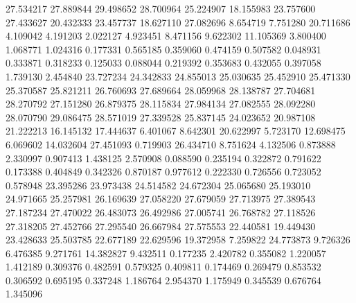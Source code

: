 27.534217
27.889844
29.498652
28.700964
25.224907
18.155983
23.757600
27.433627
20.432333
23.457737
18.627110
27.082696
8.654719
7.751280
20.711686
4.109042
4.191203
2.022127
4.923451
8.471156
9.622302
11.105369
3.800400
1.068771
1.024316
0.177331
0.565185
0.359060
0.474159
0.507582
0.048931
0.333871
0.318233
0.125033
0.088044
0.219392
0.353683
0.432055
0.397058
1.739130
2.454840
23.727234
24.342833
24.855013
25.030635
25.452910
25.471330
25.370587
25.821211
26.760693
27.689664
28.059968
28.138787
27.704681
28.270792
27.151280
26.879375
28.115834
27.984134
27.082555
28.092280
28.070790
29.086475
28.571019
27.339528
25.837145
24.023652
20.987108
21.222213
16.145132
17.444637
6.401067
8.642301
20.622997
5.723170
12.698475
6.069602
14.032604
27.451093
0.719903
26.434710
8.751624
4.132506
0.873888
2.330997
0.907413
1.438125
2.570908
0.088590
0.235194
0.322872
0.791622
0.173388
0.404849
0.342326
0.870187
0.977612
0.222330
0.726556
0.723052
0.578948
23.395286
23.973438
24.514582
24.672304
25.065680
25.193010
24.971665
25.257981
26.169639
27.058220
27.679059
27.713975
27.389543
27.187234
27.470022
26.483073
26.492986
27.005741
26.768782
27.118526
27.318205
27.452766
27.295540
26.667984
27.575553
22.440581
19.449430
23.428633
25.503785
22.677189
22.629596
19.372958
7.259822
24.773873
9.726326
6.476385
9.271761
14.382827
9.432511
0.177235
2.420782
0.355082
1.220057
1.412189
0.309376
0.482591
0.579325
0.409811
0.174469
0.269479
0.853532
0.306592
0.695195
0.337248
1.186764
2.954370
1.175949
0.345539
0.676764
1.345096
